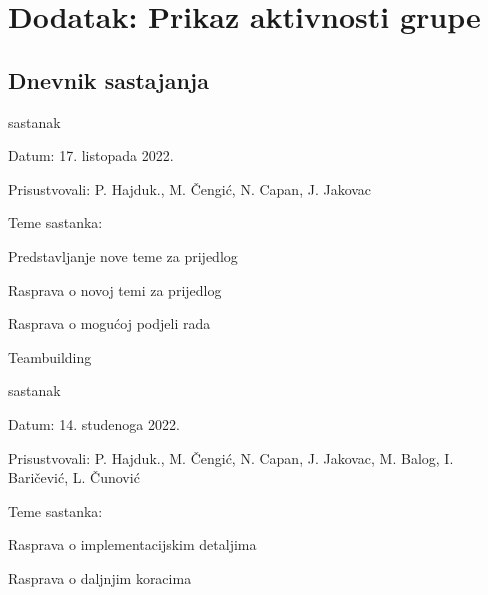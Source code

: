 \chapter*{Dodatak: Prikaz aktivnosti grupe}
		
		\section*{Dnevnik sastajanja}
		
		
		
		\begin{packed_enum}
			\item  sastanak
			
			\item[] \begin{packed_item}
				\item Datum: 17. listopada 2022.
				\item Prisustvovali: P. Hajduk., M. Čengić, N. Capan, J. Jakovac
				\item Teme sastanka:
				\begin{packed_item}
					\item  Predstavljanje nove teme za prijedlog
					\item  Rasprava o novoj temi za prijedlog
					\item  Rasprava o mogućoj podjeli rada
					\item  Teambuilding
				\end{packed_item}
			\end{packed_item}
			
			\item  sastanak
			\item[] \begin{packed_item}
				\item Datum: 14. studenoga 2022.
				\item Prisustvovali: P. Hajduk., M. Čengić, N. Capan, J. Jakovac, M. Balog, I. Baričević, L. Čunović
				\item Teme sastanka:
				\begin{packed_item}
					\item  Rasprava o implementacijskim detaljima
					\item  Rasprava o daljnjim koracima
				\end{packed_item}
			\end{packed_item}
			

\end{packed_enum}
